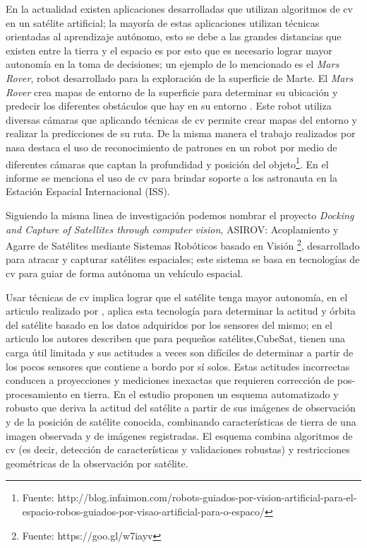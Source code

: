 En la actualidad existen aplicaciones desarrolladas que utilizan algoritmos de \ac{cv} en un satélite artificial; la mayoría de estas aplicaciones utilizan técnicas orientadas al aprendizaje autónomo, esto se debe a las grandes distancias que existen entre la tierra y el espacio es por esto que es necesario lograr mayor autonomía en la toma de decisiones; un ejemplo de lo mencionado es el \textit{Mars Rover}, robot desarrollado para la exploración de la superficie de Marte. El \textit{Mars Rover} crea mapas de entorno de la superficie para determinar su ubicación y predecir los diferentes obstáculos que hay en su entorno \citep{RoverMars}. Este robot utiliza  diversas cámaras que aplicando técnicas de \ac{cv}  permite crear mapas del entorno y realizar la predicciones de su ruta. De la misma manera el trabajo realizados  por \ac{nasa}  destaca el uso de reconocimiento de patrones en un robot por medio de diferentes cámaras que captan la profundidad y posición del objeto\footnote{Fuente: 
http://blog.infaimon.com/robots-guiados-por-vision-artificial-para-el-espacio-robos-guiados-por-visao-artificial-para-o-espaco/}. En el informe se menciona el uso de \ac{cv} para brindar soporte a los astronauta en la Estación Espacial Internacional (ISS). 

Siguiendo la misma linea de investigación podemos nombrar el proyecto \textit{Docking and Capture of Satellites through computer vision}, ASIROV: Acoplamiento y Agarre de Satélites mediante Sistemas Robóticos basado en Visión \footnote{Fuente: https://goo.gl/w7iayv}, desarrollado para atracar y capturar satélites espaciales; este sistema se basa  en tecnologías de \ac{cv} para guiar de forma autónoma un vehículo espacial.


Usar técnicas de \ac{cv} implica lograr que el satélite tenga mayor autonomía, en el articulo realizado por \cite{Kouyama}, aplica esta tecnología para determinar la actitud y órbita del satélite basado en los datos adquiridos por los sensores del mismo; en el articulo los autores describen que para pequeños satélites,CubeSat, tienen una carga útil limitada y sus actitudes a veces son difíciles de determinar a partir de los pocos sensores que contiene a bordo por sí solos. Estas actitudes incorrectas conducen a proyecciones y mediciones inexactas que requieren corrección de pos-procesamiento en tierra. En el estudio proponen un esquema automatizado y robusto que deriva la actitud del satélite a partir de sus imágenes de observación y de la posición de satélite conocida, combinando características de tierra de una imagen observada y de imágenes registradas. El esquema combina algoritmos de \ac{cv} (es decir, detección de características y validaciones robustas) y restricciones geométricas de la observación por satélite.

